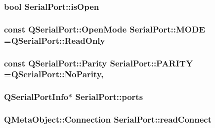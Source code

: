 \hypertarget{class_serial_port_ab4a0ae7dd5d94991088247289935424d}{
\subsubsection[{is\-Open}]{\setlength{\rightskip}{0pt plus 5cm}bool Serial\-Port\-::is\-Open\hspace{0.3cm}{\ttfamily [private]}}}\label{class_serial_port_ab4a0ae7dd5d94991088247289935424d}
\hypertarget{class_serial_port_a92c94e506ac3ae86ea1e787c0d7b138f}{
\subsubsection[{M\-O\-D\-E}]{\setlength{\rightskip}{0pt plus 5cm}const Q\-Serial\-Port\-::\-Open\-Mode Serial\-Port\-::\-M\-O\-D\-E =Q\-Serial\-Port\-::\-Read\-Only\hspace{0.3cm}{\ttfamily [private]}}}\label{class_serial_port_a92c94e506ac3ae86ea1e787c0d7b138f}
\hypertarget{class_serial_port_afb8f52adfc0898451eb78eb5961b125c}{
\subsubsection[{P\-A\-R\-I\-T\-Y}]{\setlength{\rightskip}{0pt plus 5cm}const Q\-Serial\-Port\-::\-Parity Serial\-Port\-::\-P\-A\-R\-I\-T\-Y =Q\-Serial\-Port\-::\-No\-Parity\hspace{0.3cm}{\ttfamily [static]}, {\ttfamily [private]}}}\label{class_serial_port_afb8f52adfc0898451eb78eb5961b125c}
\hypertarget{class_serial_port_aead0028dd7ba1073c5a0cf6f1775106b}{
\subsubsection[{ports}]{\setlength{\rightskip}{0pt plus 5cm}Q\-Serial\-Port\-Info$\ast$ Serial\-Port\-::ports\hspace{0.3cm}{\ttfamily [private]}}}\label{class_serial_port_aead0028dd7ba1073c5a0cf6f1775106b}
\hypertarget{class_serial_port_a63896cd014af7968402b8e7f051f24b3}{
\subsubsection[{read\-Connect}]{\setlength{\rightskip}{0pt plus 5cm}Q\-Meta\-Object\-::\-Connection Serial\-Port\-::read\-Connect\hspace{0.3cm}{\ttfamily [private]}}}\label{class_serial_port_a63896cd014af7968402b8e7f051f24b3}
